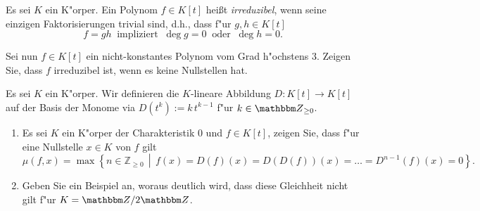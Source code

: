 \documentclass[a4,11pt]{article}
\begin{document}
\vspace*{-17mm}
{
\kopf
}


\begin{aufgabe}[4 Punkte]
Es sei $K$ ein K"orper. Ein Polynom $f\in K[t]$ heißt
\emph{irreduzibel}, wenn seine einzigen Faktorisierungen trivial sind,
d.h., dass f"ur $g,h \in K[t]$
\[
f = gh \ \text{ impliziert } \ \deg g = 0 \ \text{ oder } \ \deg h = 0.
\]


Sei nun $f\in K[t]$ ein nicht-konstantes Polynom
vom Grad h"ochstens $3$. Zeigen Sie, dass $f$ irreduzibel ist, wenn es
keine Nullstellen hat.

\end{aufgabe}

\begin{aufgabe}[4 Punkte]
Es sei $K$ ein K"orper. Wir definieren die $K$-lineare Abbildung $D
\colon K[t] \to K[t]$ auf der Basis der Monome via $D(t^k) := k\,t^{k-1}$
f"ur $k \in \Z_{\ge 0}$. 
  
\begin{enumerate}
\item Es sei $K$ ein K"orper der Charakteristik $0$ und $f \in K[t]$, zeigen Sie, dass f"ur eine Nullstelle $x\in K$ von $f$ gilt
\[
\mu(f,x) = \max \left\{ n \in \mathbb{Z}_{\geq 0} \,\middle|\, f(x) = D(f)(x) =
D(D(f))(x) = \ldots = D^{n-1}(f)(x) = 0 \right\}.
\]
\item Geben Sie ein Beispiel an, woraus deutlich wird, dass diese Gleichheit nicht gilt f"ur $K = \Z/2\Z$.
\end{enumerate}

\end{aufgabe}
\end{document}
